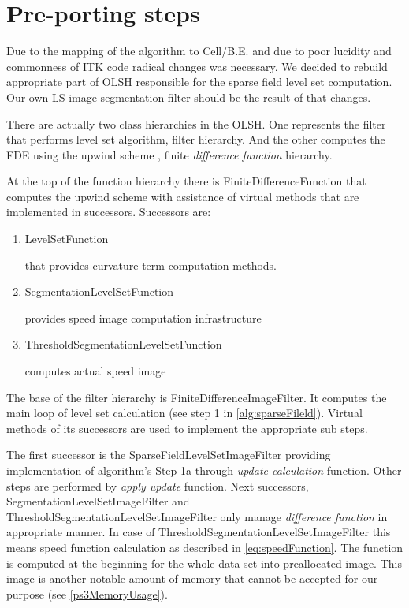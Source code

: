 \section{Pre-porting steps}
\par
Due to the mapping of the algorithm to Cell/B.E. and due to poor lucidity and commonness of ITK code radical changes was necessary.
We decided to rebuild appropriate part of OLSH responsible for the sparse field level set computation.
Our own LS image segmentation filter should be the result of that changes.

\par
There are actually two class hierarchies in the OLSH.
One represents the filter that performs level set algorithm, filter hierarchy.
And the other computes the FDE using the upwind scheme \cite{sethianLS}, finite \emph{difference function} hierarchy.

\par
At the top of the function hierarchy there is FiniteDifferenceFunction that computes the upwind scheme with assistance of virtual methods that are implemented in successors.
Successors are:
\begin{enumerate}
  \item{LevelSetFunction}
  \par
  that provides curvature term computation methods.

\item{SegmentationLevelSetFunction}
\par
provides speed image computation infrastructure

\item{ThresholdSegmentationLevelSetFunction}
\par
computes actual speed image
\end{enumerate}

\par
The base of the filter hierarchy is FiniteDifferenceImageFilter.
It computes the main loop of level set calculation (see step 1 in \ref{alg:sparseFileld}).
Virtual methods of its successors are used to implement the appropriate sub steps.

\par
The first successor is the SparseFieldLevelSetImageFilter providing implementation of algorithm's Step 1a through \emph{update calculation} function.
Other steps are performed by \emph{apply update} function.
Next successors, SegmentationLevelSetImageFilter and ThresholdSegmentationLevelSetImageFilter only manage \emph{difference function} in appropriate manner.
In case of ThresholdSegmentationLevelSetImageFilter this means speed function calculation as described in \ref{eq:speedFunction}.
The function is computed at the beginning for the whole data set into preallocated image.
This image is another notable amount of memory that cannot be accepted for our purpose (see \ref{ps3MemoryUsage}).

